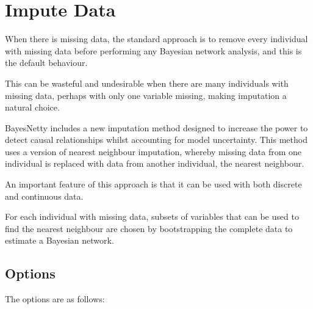 \documentclass[a4paper,12pt]{article}
\begin{document}

\section{Impute Data}
\label{impute-data}

When there is missing data, the standard approach is to remove every individual with missing data before performing any Bayesian network analysis, and this is the default behaviour. 

This can be wasteful and undesirable when there are many individuals with missing data, perhaps with only one variable missing, making imputation a natural choice. 

BayesNetty includes a new imputation method designed to increase the power to detect causal relationships whilst accounting for model uncertainty. This method uses a version of nearest neighbour imputation, whereby missing data from one individual is replaced with data from another individual, the nearest neighbour. 

An important feature of this approach is that it can be used with both discrete and continuous data. 

For each individual with missing data, subsets of variables that can be used to find the nearest neighbour are chosen by bootstrapping the complete data to estimate a Bayesian network. 
\subsection{Options}
\label{impute-data-options}

The options are as follows: 
\end{document}
